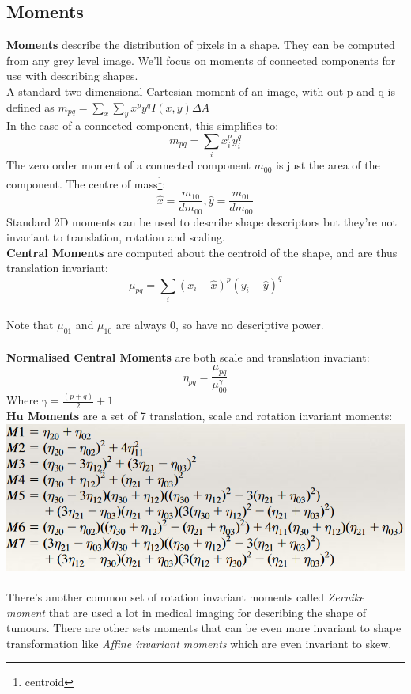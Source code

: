 \documentclass{article}
\begin{document}
	\subsection{Moments}
	\textbf{Moments} describe the distribution of pixels in a shape. They can be computed from any grey level image. We'll focus on moments of connected components for use with describing shapes.\\
	A standard two-dimensional Cartesian moment of an image, with out p and q is defined as $m_{pq}=\sum_x\sum_yx^py^qI(x,y)\Delta A$\\
	In the case of a connected component, this simplifies to:
	$$m_{pq}=\sum_ix_i^py_i^q$$
	The zero order moment of a connected component $m_{00}$ is just the area of the component. The centre of mass\footnote{centroid}:
	$$\hat{x}=\frac{m_{10}}{dm_{00}},\hat{y}=\frac{m_{01}}{dm_{00}}$$
	Standard 2D moments can be used to describe shape descriptors but they're not invariant to translation, rotation and scaling.\\
	\textbf{Central Moments} are computed about the centroid of the shape, and are thus translation invariant:
	$$\mu_{pq}=\sum_i(x_i-\hat{x})^p(y_i-\hat{y})^q$$\\
	Note that $\mu_{01}$ and $\mu_{10}$ are always 0, so have no descriptive power.\\
	\\
	\textbf{Normalised Central Moments} are both scale and translation invariant:
	$$\eta_{pq}=\frac{\mu_{pq}}{\mu_{00}^\gamma}$$ Where $\gamma=\frac{(p+q)}{2}+1$\\
	\textbf{Hu Moments} are a set of 7 translation, scale and rotation invariant moments:
	\includegraphics[scale=0.4]{hu_moments}\\
	\\
	There's another common set of rotation invariant moments called \textit{Zernike moment} that are used a lot in medical imaging for describing the shape of tumours. There are other sets moments that can be even more invariant to shape transformation like \textit{Affine invariant moments} which are even invariant to skew.
\end{document}

